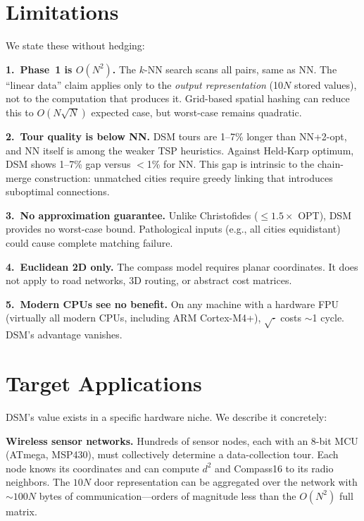 \documentclass[11pt,a4paper,twocolumn]{article}
\begin{document}
\FloatBarrier
\section{Limitations}\label{sec:limits}

We state these without hedging:

\textbf{1.\ Phase~1 is $O(N^2)$.} The $k$-NN search scans all pairs, same as NN. The ``linear data'' claim applies only to the \textit{output representation} (10$N$ stored values), not to the computation that produces it. Grid-based spatial hashing can reduce this to $O(N\sqrt{N})$ expected case, but worst-case remains quadratic.

\textbf{2.\ Tour quality is below NN.} DSM tours are 1--7\% longer than NN+2-opt, and NN itself is among the weaker TSP heuristics. Against Held-Karp optimum, DSM shows 1--7\% gap versus $<$1\% for NN. This gap is intrinsic to the chain-merge construction: unmatched cities require greedy linking that introduces suboptimal connections.

\textbf{3.\ No approximation guarantee.} Unlike Christofides ($\leq 1.5\times$ OPT), DSM provides no worst-case bound. Pathological inputs (e.g., all cities equidistant) could cause complete matching failure.

\textbf{4.\ Euclidean 2D only.} The compass model requires planar coordinates. It does not apply to road networks, 3D routing, or abstract cost matrices.

\textbf{5.\ Modern CPUs see no benefit.} On any machine with a hardware FPU (virtually all modern CPUs, including ARM Cortex-M4+), $\sqrt{\cdot}$ costs $\sim$1 cycle. DSM's advantage vanishes.

\FloatBarrier
\section{Target Applications}\label{sec:apps}

DSM's value exists in a specific hardware niche. We describe it concretely:

\textbf{Wireless sensor networks.} Hundreds of sensor nodes, each with an 8-bit MCU (ATmega, MSP430), must collectively determine a data-collection tour. Each node knows its coordinates and can compute $d^2$ and Compass16 to its radio neighbors. The $10N$ door representation can be aggregated over the network with ${\sim}100N$ bytes of communication---orders of magnitude less than the $O(N^2)$ full matrix.
\end{document}
